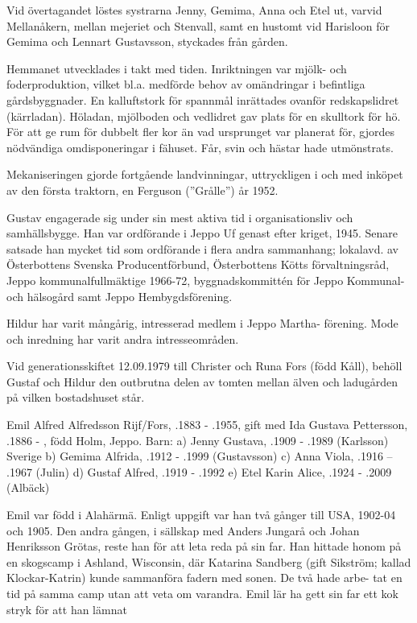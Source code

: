 Vid övertagandet löstes systrarna Jenny, Gemima, Anna och Etel ut, varvid Mellanåkern, mellan mejeriet och Stenvall, samt en hustomt vid Harisloon för Gemima och Lennart Gustavsson, styckades från gården.


Hemmanet utvecklades i takt med tiden. Inriktningen var mjölk- och foderproduktion, vilket bl.a. medförde behov av omändringar i befintliga gårdsbyggnader. En kalluftstork för spannmål inrättades ovanför redskapslidret (kärrladan). Höladan, mjölboden och vedlidret gav plats för en skulltork för hö. För att ge rum för dubbelt fler kor än vad ursprunget var planerat för, gjordes nödvändiga omdisponeringar i fähuset. Får, svin och hästar hade utmönstrats.

Mekaniseringen gjorde fortgående landvinningar, uttryckligen i och med inköpet av den första traktorn, en Ferguson (”Grålle”) år 1952.

Gustav engagerade sig under sin mest aktiva tid i organisationsliv och samhällsbygge. Han var ordförande i Jeppo Uf genast efter kriget, 1945. Senare satsade han mycket tid som ordförande i flera andra sammanhang; lokalavd. av Österbottens Svenska Producentförbund, Österbottens Kötts förvaltningsråd, Jeppo kommunalfullmäktige 1966-72, byggnadskommittén för Jeppo Kommunal- och hälsogård samt Jeppo Hembygdsförening.

Hildur har varit mångårig, intresserad medlem i Jeppo Martha- förening. Mode och inredning har varit andra intresseområden.

Vid generationsskiftet 12.09.1979 till Christer och Runa Fors (född Kåll), behöll Gustaf och Hildur den outbrutna delen av tomten mellan älven och ladugården på vilken bostadshuset står.


Emil Alfred Alfredsson Rijf/Fors, .1883 - .1955, gift med Ida Gustava Pettersson, .1886 - , född Holm, Jeppo. Barn: a) Jenny Gustava, .1909 - .1989 (Karlsson) Sverige
b) Gemima Alfrida, .1912 - .1999 (Gustavsson) c) Anna Viola, .1916 – .1967 (Julin)
d) Gustaf Alfred, .1919 - .1992
e) Etel Karin Alice, .1924 - .2009 (Albäck)

Emil var född i Alahärmä. Enligt uppgift var han två gånger till USA, 1902-04 och 1905. Den andra gången, i sällskap med Anders Jungarå och Johan Henriksson Grötas, reste han för att leta reda på sin far. Han hittade honom på en skogscamp i Ashland, Wisconsin, där Katarina Sandberg (gift Sikström; kallad Klockar-Katrin) kunde sammanföra fadern med sonen. De två hade arbe- tat en tid på samma camp utan att veta om varandra. Emil lär ha gett sin far ett kok stryk för att han lämnat

